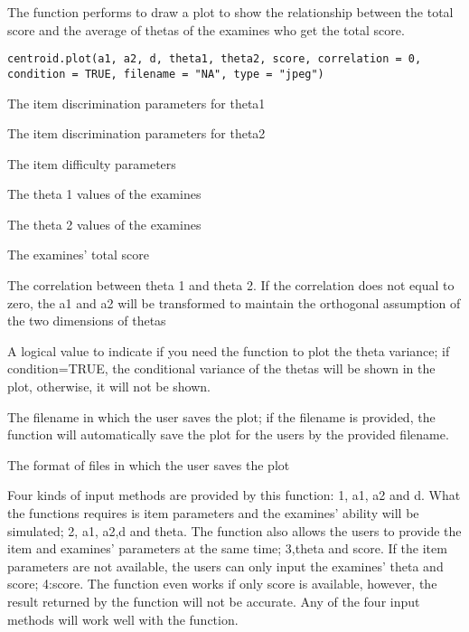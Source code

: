 \begin{Description}\relax
The function performs to draw a plot to show the relationship between the total score and the average of thetas of the examines who get the total score.
\end{Description}
\begin{Usage}
\begin{verbatim}
centroid.plot(a1, a2, d, theta1, theta2, score, correlation = 0, condition = TRUE, filename = "NA", type = "jpeg")
\end{verbatim}
\end{Usage}
\begin{Arguments}
\begin{ldescription}
\item[\code{a1}] The item discrimination parameters for theta1 
\item[\code{a2}] The item discrimination parameters for theta2 
\item[\code{d}] The item difficulty parameters 
\item[\code{theta1}] The theta 1 values of the examines
\item[\code{theta2}] The theta 2 values of the examines 
\item[\code{score}] The examines' total score 
\item[\code{correlation}] The correlation between theta 1 and theta 2. If the correlation does not equal to zero, the a1 and a2 will be transformed to maintain the orthogonal assumption of the two dimensions of thetas
\item[\code{condition}] A logical value to indicate if you need the function to plot the theta variance; if condition=TRUE, the conditional variance of the thetas will be shown in the plot, otherwise, it will not be shown. 
\item[\code{filename}] The filename in which the user saves the plot; if the filename is provided, the function will automatically save the plot for the users by the provided filename. 
\item[\code{type}] The format of files in which the user saves the plot 
\end{ldescription}
\end{Arguments}
\begin{Details}\relax
Four kinds of input methods are provided by this function: 1, a1, a2 and d. What the functions requires is item parameters and the examines' ability will be simulated;
2, a1, a2,d and theta. The function also allows the users to provide the item and examines' parameters at the same time; 3,theta and score. If the item parameters are not available, the users can only 
input the examines' theta and score; 4:score. The function even works if only score is available, however, the result returned by the function will not be accurate. Any of the four input methods will work well with the function.
\end{Details}
